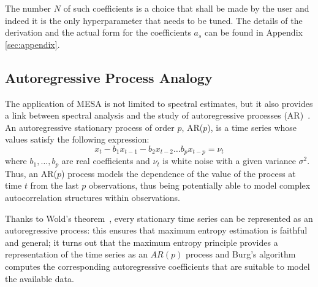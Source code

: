 \documentclass[epj,nopacs]{svjour}
\begin{document}
The number $N$ of such coefficients is a choice that shall be made by the user and indeed it is the only hyperparameter that needs to be tuned. The details of the derivation and the actual form for the coefficients $a_s$ can be found in Appendix \ref{sec:appendix}.

\subsection{Autoregressive Process Analogy} \label{sec:autoregr}

The application of MESA is not limited to spectral estimates, but it also provides a link between spectral analysis and the study
of autoregressive processes (AR)~\cite{doi:10.1029/RG013i001p00183}.
An autoregressive stationary process of order $p$, AR($p$), is a time series whose values satisfy the following expression: 
\begin{equation} \label{eq:AR_p}
    x_t - b_1 x_{t-1} - b_2 x_{t-2} \dots b_p x_{t - p} = \nu_t
\end{equation}
where $b_1, \ldots, b_p$ are real coefficients and $\nu_t$ is white noise with a given variance $\sigma^2$.
Thus, an AR($p$) process models the dependence of the value of the process at time $t$ from the last $p$ observations, 
thus being potentially able to model complex autocorrelation structures within observations.

Thanks to Wold's theorem~\cite{Wold_theorem}, every stationary time series can be represented as an autoregressive process: this ensures that maximum entropy estimation is faithful and general; it turns out that the maximum entropy principle provides a representation of the time series as an $AR(p)$ process and Burg's algorithm computes the corresponding autoregressive coefficients that are suitable to model the available data.
\end{document}
